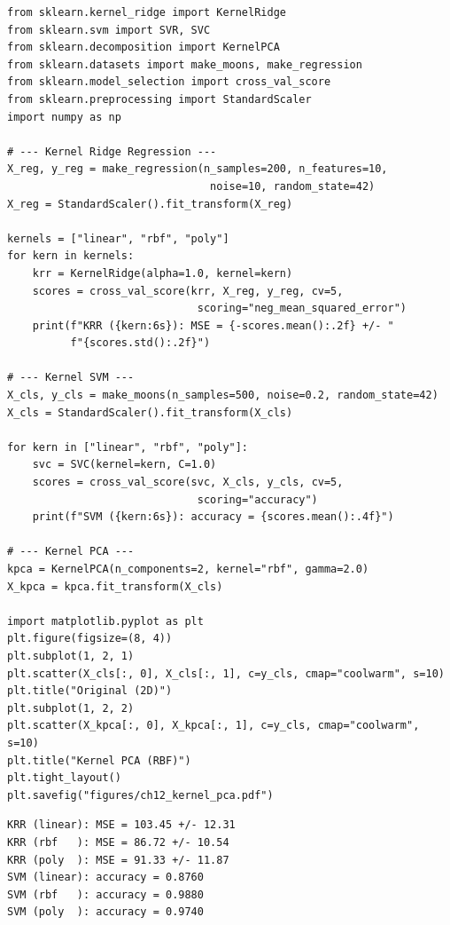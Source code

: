 \begin{codeblock}[title=\textbf{Kernel Methods with scikit-learn}]
\begin{verbatim}
from sklearn.kernel_ridge import KernelRidge
from sklearn.svm import SVR, SVC
from sklearn.decomposition import KernelPCA
from sklearn.datasets import make_moons, make_regression
from sklearn.model_selection import cross_val_score
from sklearn.preprocessing import StandardScaler
import numpy as np

# --- Kernel Ridge Regression ---
X_reg, y_reg = make_regression(n_samples=200, n_features=10,
                                noise=10, random_state=42)
X_reg = StandardScaler().fit_transform(X_reg)

kernels = ["linear", "rbf", "poly"]
for kern in kernels:
    krr = KernelRidge(alpha=1.0, kernel=kern)
    scores = cross_val_score(krr, X_reg, y_reg, cv=5,
                              scoring="neg_mean_squared_error")
    print(f"KRR ({kern:6s}): MSE = {-scores.mean():.2f} +/- "
          f"{scores.std():.2f}")

# --- Kernel SVM ---
X_cls, y_cls = make_moons(n_samples=500, noise=0.2, random_state=42)
X_cls = StandardScaler().fit_transform(X_cls)

for kern in ["linear", "rbf", "poly"]:
    svc = SVC(kernel=kern, C=1.0)
    scores = cross_val_score(svc, X_cls, y_cls, cv=5,
                              scoring="accuracy")
    print(f"SVM ({kern:6s}): accuracy = {scores.mean():.4f}")

# --- Kernel PCA ---
kpca = KernelPCA(n_components=2, kernel="rbf", gamma=2.0)
X_kpca = kpca.fit_transform(X_cls)

import matplotlib.pyplot as plt
plt.figure(figsize=(8, 4))
plt.subplot(1, 2, 1)
plt.scatter(X_cls[:, 0], X_cls[:, 1], c=y_cls, cmap="coolwarm", s=10)
plt.title("Original (2D)")
plt.subplot(1, 2, 2)
plt.scatter(X_kpca[:, 0], X_kpca[:, 1], c=y_cls, cmap="coolwarm", s=10)
plt.title("Kernel PCA (RBF)")
plt.tight_layout()
plt.savefig("figures/ch12_kernel_pca.pdf")
\end{verbatim}
\end{codeblock}

\begin{codeoutput}
\begin{verbatim}
KRR (linear): MSE = 103.45 +/- 12.31
KRR (rbf   ): MSE = 86.72 +/- 10.54
KRR (poly  ): MSE = 91.33 +/- 11.87
SVM (linear): accuracy = 0.8760
SVM (rbf   ): accuracy = 0.9880
SVM (poly  ): accuracy = 0.9740
\end{verbatim}
\end{codeoutput}

